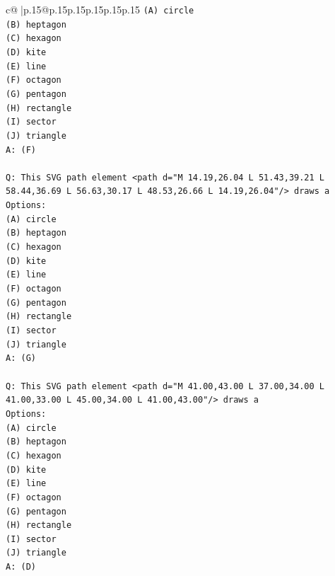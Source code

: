 \documentclass{article}
\begin{document}
{\begin{supertabular}{c@{$\;$}|p{.15\linewidth}@{}p{.15\linewidth}p{.15\linewidth}p{.15\linewidth}p{.15\linewidth}p{.15\linewidth}}
{{{\texttt{(A) circle} \\
\texttt{(B) heptagon} \\
\texttt{(C) hexagon} \\
\texttt{(D) kite} \\
\texttt{(E) line} \\
\texttt{(F) octagon} \\
\texttt{(G) pentagon} \\
\texttt{(H) rectangle} \\
\texttt{(I) sector} \\
\texttt{(J) triangle} \\
\texttt{A: (F)} \\
\\ 
\texttt{Q: This SVG path element <path d="M 14.19,26.04 L 51.43,39.21 L 58.44,36.69 L 56.63,30.17 L 48.53,26.66 L 14.19,26.04"/> draws a} \\
\texttt{Options:} \\
\texttt{(A) circle} \\
\texttt{(B) heptagon} \\
\texttt{(C) hexagon} \\
\texttt{(D) kite} \\
\texttt{(E) line} \\
\texttt{(F) octagon} \\
\texttt{(G) pentagon} \\
\texttt{(H) rectangle} \\
\texttt{(I) sector} \\
\texttt{(J) triangle} \\
\texttt{A: (G)} \\
\\ 
\texttt{Q: This SVG path element <path d="M 41.00,43.00 L 37.00,34.00 L 41.00,33.00 L 45.00,34.00 L 41.00,43.00"/> draws a} \\
\texttt{Options:} \\
\texttt{(A) circle} \\
\texttt{(B) heptagon} \\
\texttt{(C) hexagon} \\
\texttt{(D) kite} \\
\texttt{(E) line} \\
\texttt{(F) octagon} \\
\texttt{(G) pentagon} \\
\texttt{(H) rectangle} \\
\texttt{(I) sector} \\
\texttt{(J) triangle} \\
\texttt{A: (D)} \\
}}}
\end{supertabular}}
\end{document}
